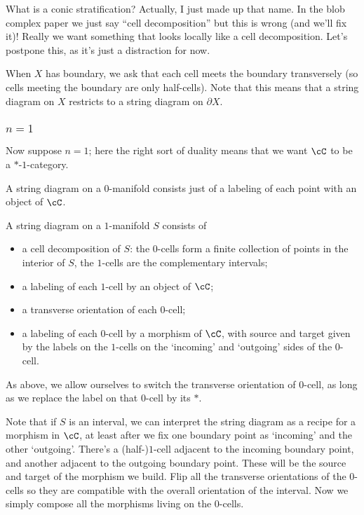 \documentclass[11pt]{amsart}
\theoremstyle{plain}
\newcommand{\bdy}{\partial}
\begin{document}
What is a conic stratification? Actually, I just made up that name. In the blob complex paper we just say ``cell decomposition'' but this is wrong (and we'll fix it)! Really we want something that looks locally like a cell decomposition. Let's postpone this, as it's just a distraction for now.

When $X$ has boundary, we ask that each cell meets the boundary transversely (so cells meeting the boundary are only half-cells). Note that this means that a string diagram on $X$ restricts to a string diagram on $\bdy X$.

\subsubsection{$n=1$}
Now suppose $n=1$; here the right sort of duality means that we want $\cC$ to be a $*$-$1$-category.

A string diagram on a $0$-manifold consists just of a labeling of each point with an object of $\cC$.

A string diagram on a $1$-manifold $S$ consists of
\begin{itemize}
\item a cell decomposition of $S$: the $0$-cells form a finite collection of points in the interior of $S$, the $1$-cells are the complementary intervals;
\item a labeling of each $1$-cell by an object of $\cC$;
\item a transverse orientation of each $0$-cell;
\item a labeling of each $0$-cell by a morphism of $\cC$, with source and target given by the labels on the $1$-cells on the `incoming' and `outgoing' sides of the $0$-cell.
\end{itemize}
As above, we allow ourselves to switch the transverse orientation of  $0$-cell, as long as we replace the label on that $0$-cell by its $*$.

Note that if $S$ is an interval, we can interpret the string diagram as a recipe for a morphism in $\cC$, at least after we fix one boundary point as `incoming' and the other `outgoing'. There's a (half-)$1$-cell adjacent to the incoming boundary point, and another adjacent to the outgoing boundary point. These will be the source and target of the morphism we build. Flip all the transverse orientations of the $0$-cells so they are compatible with the overall orientation of the interval. Now we simply compose all the morphisms living on the $0$-cells.
\end{document}
